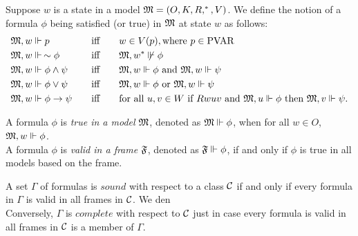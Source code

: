 \begin{definition}[Satisfaction]
    Suppose $w$ is a state in a model $\mathfrak{M} = (O, K, R, ^*, V)$. We define the notion of a formula $\phi$ being satisfied (or true) in $\mathfrak{M}$ at state $w$ as follows:
    \begin{alignat*}{3}
        &\mathfrak{M}, w \Vdash p\quad &&\text{iff}\quad&& w\in V(p), \text{where } p\in \text{PVAR}\\
        &\mathfrak{M}, w \Vdash \,\sim\phi\quad &&\text{iff}\quad && \mathfrak{M},w^* \not\Vdash\phi\\
        &\mathfrak{M}, w \Vdash \phi\wedge\psi\quad &&\text{iff}\quad &&\mathfrak{M},w \Vdash\phi \text{ and } \mathfrak{M},w \Vdash \psi\\
        &\mathfrak{M}, w \Vdash \phi\vee\psi\quad &&\text{iff}\quad &&\mathfrak{M},w \Vdash\phi \text{ or } \mathfrak{M},w \Vdash \psi\\
        &\mathfrak{M}, w \Vdash \phi\to\psi\quad &&\text{iff}\quad &&\text{for all } u,v\in W  \text{ if }  Rwuv \text{ and } \mathfrak{M},u\Vdash\phi \text{ then } \mathfrak{M},v \Vdash \psi.
    \end{alignat*}
\end{definition}

\begin{definition}
    A formula $\phi$ is \textit{true in a model} $\mathfrak{M}$, denoted as $\mathfrak{M}\Vdash\phi$, when for all $w\in O$, $\mathfrak{M},w\Vdash\phi$.\\
    A formula $\phi$ is \textit{valid in a frame} $\mathfrak{F}$, denoted as $\mathfrak{F}\Vdash\phi$, if and only if $\phi$ is true in all models based on the frame.
\end{definition}

\begin{definition}
    A set $\Gamma$ of formulas is $\textit{sound}$ with respect to a class $\mathcal{C}$ if and only if every formula in $\Gamma$ is valid in all frames in $\mathcal{C}$. We den\\
    Conversely, $\Gamma$ is $\textit{complete}$ with respect to $\mathcal{C}$ just in case every formula is valid in all frames in $\mathcal{C}$ is a member of $\Gamma$.
\end{definition}

